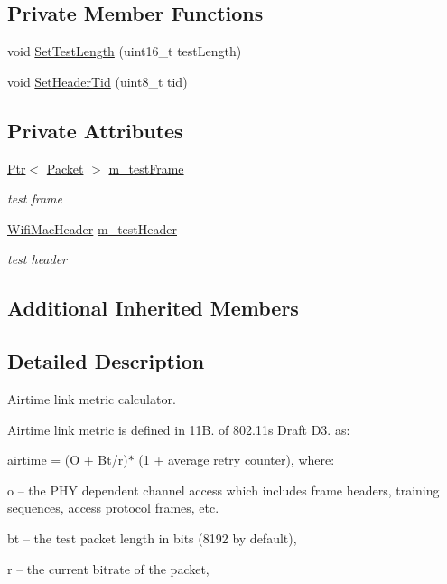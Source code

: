 \subsection*{Private Member Functions}
\begin{DoxyCompactItemize}
\item 
void \hyperlink{classns3_1_1dot11s_1_1AirtimeLinkMetricCalculator_abcae7234079e2c8ca360d8fb2b1e85d9}{Set\+Test\+Length} (uint16\+\_\+t test\+Length)
\item 
void \hyperlink{classns3_1_1dot11s_1_1AirtimeLinkMetricCalculator_aa6cca3c42a0677e2b168275d88e19dbb}{Set\+Header\+Tid} (uint8\+\_\+t tid)
\end{DoxyCompactItemize}
\subsection*{Private Attributes}
\begin{DoxyCompactItemize}
\item 
\hyperlink{classns3_1_1Ptr}{Ptr}$<$ \hyperlink{classns3_1_1Packet}{Packet} $>$ \hyperlink{classns3_1_1dot11s_1_1AirtimeLinkMetricCalculator_a28cc4e99da4ac3b38604bc512903b677}{m\+\_\+test\+Frame}
\begin{DoxyCompactList}\small\item\em test frame \end{DoxyCompactList}\item 
\hyperlink{classns3_1_1WifiMacHeader}{Wifi\+Mac\+Header} \hyperlink{classns3_1_1dot11s_1_1AirtimeLinkMetricCalculator_ab0ae80f5adbf2dedd3346a934baf5943}{m\+\_\+test\+Header}
\begin{DoxyCompactList}\small\item\em test header \end{DoxyCompactList}\end{DoxyCompactItemize}
\subsection*{Additional Inherited Members}


\subsection{Detailed Description}
Airtime link metric calculator. 

Airtime link metric is defined in 11\+B. of 802.\+11s Draft D3. as\+:

airtime = (O + Bt/r)$\ast$ (1 + average retry counter), where\+:
\begin{DoxyItemize}
\item o -- the P\+HY dependent channel access which includes frame headers, training sequences, access protocol frames, etc.
\item bt -- the test packet length in bits (8192 by default),
\item r -- the current bitrate of the packet,
\end{DoxyItemize}

